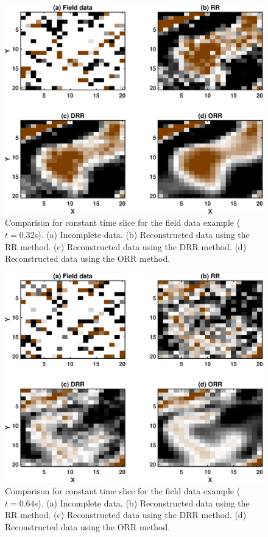{\begin{figure}
	\centering
	\includegraphics[width=\textwidth]{Fig/field_dn_N12_t80}
	\caption{Comparison for constant time slice for the field data example ($t=0.32$s). (a) Incomplete data. (b) Reconstructed data using the RR method. (c) Reconstructed data using the DRR method. (d) Reconstructed data using the ORR method. }
	\label{fig:field_dn_N12_t80}
\end{figure}

\begin{figure}
	\centering
	\includegraphics[width=\textwidth]{Fig/field_dn_N12_t160}
	\caption{Comparison for constant time slice for the field data example ($t=0.64$s). (a) Incomplete data. (b) Reconstructed data using the RR method. (c) Reconstructed data using the DRR method. (d) Reconstructed data using the ORR method. }
	\label{fig:field_dn_N12_t160}
\end{figure}

}


